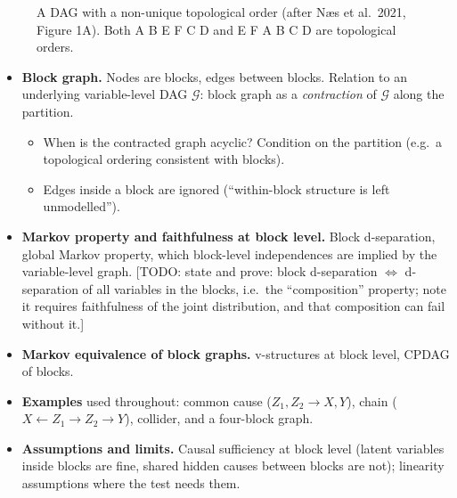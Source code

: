 \documentclass[10pt,leqno]{amsart}
\newcommand{\todo}[1]{{\color{red}[TODO: #1]}}
\begin{document}
\begin{figure}[H]
\centering
{}
\caption{A DAG with a non-unique topological order (after Næs et al.\ 2021,
Figure 1A). Both A B E F C D and E F A B C D are topological orders.}
\label{fig:nonunique-order}
\end{figure}
 
 \begin{itemize}
\item \textbf{Block graph.} Nodes are blocks, edges between blocks. Relation to an
  underlying variable-level DAG $\mathcal{G}$: block graph as a \emph{contraction} of
  $\mathcal{G}$ along the partition.
  \begin{itemize}
  \item When is the contracted graph acyclic? Condition on the partition
    (e.g.\ a topological ordering consistent with blocks).
  \item Edges inside a block are ignored (``within-block structure is left
    unmodelled'').
  \end{itemize}
\item \textbf{Markov property and faithfulness at block level.} Block
  d-separation, global Markov property, which block-level independences are implied
  by the variable-level graph. \todo{state and prove: block d-separation $\Leftrightarrow$
  d-separation of all variables in the blocks, i.e.\ the ``composition'' property;
  note it requires faithfulness of the joint distribution, and that composition
  can fail without it.}
\item \textbf{Markov equivalence of block graphs.} v-structures at block level,
  CPDAG of blocks.
\item \textbf{Examples} used throughout: common cause ($Z_1,Z_2\to X,Y$), chain
  ($X\leftarrow Z_1\to Z_2\to Y$), collider, and a four-block graph.
\item \textbf{Assumptions and limits.} Causal sufficiency at block level (latent
  variables inside blocks are fine, shared hidden causes between blocks are not);
  linearity assumptions where the test needs them.
\end{itemize}
\end{document}
